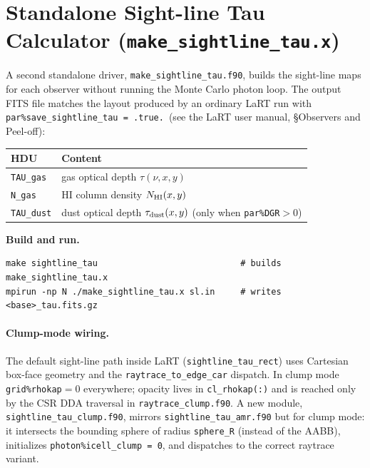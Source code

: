 \documentclass[english,a4paper]{my_memo}
\begin{document}
\section{Standalone Sight-line Tau Calculator (\texttt{make\_sightline\_tau.x})}
\label{sec:standalone_sightline_tau}

A second standalone driver, \texttt{make\_sightline\_tau.f90}, builds
the sight-line maps for each observer without running the Monte Carlo photon
loop.  The output FITS file matches the layout produced by an ordinary
LaRT run with \texttt{par\%save\_sightline\_tau~=~.true.}\ (see the
LaRT user manual, \S Observers and Peel-off):

\begin{center}
\begin{tabular}{ll}
\toprule
HDU & Content \\
\midrule
\texttt{TAU\_gas}  & gas optical depth $\tau(\nu, x, y)$ \\
\texttt{N\_gas}    & HI column density $N_{\rm HI}(x, y)$ \\
\texttt{TAU\_dust} & dust optical depth $\tau_{\rm dust}(x, y)$ (only when \texttt{par\%DGR}$>0$) \\
\bottomrule
\end{tabular}
\end{center}

\smallskip\noindent\textbf{Build and run.}
\begin{lstlisting}
make sightline_tau                            # builds make_sightline_tau.x
mpirun -np N ./make_sightline_tau.x sl.in     # writes <base>_tau.fits.gz
\end{lstlisting}

\paragraph{Clump-mode wiring.}
The default sight-line path inside LaRT (\texttt{sightline\_tau\_rect})
uses Cartesian box-face geometry and the
\texttt{raytrace\_\hspace{0pt}to\_\hspace{0pt}edge\_\hspace{0pt}car}
dispatch.  In clump mode \texttt{grid\%rhokap}$=0$ everywhere; opacity
lives in \texttt{cl\_rhokap(:)} and is reached only by the CSR DDA
traversal in \texttt{raytrace\_clump.f90}.  A new module,
\texttt{sightline\_tau\_clump.f90}, mirrors
\texttt{sightline\_tau\_amr.f90} but for clump mode: it intersects the
bounding sphere of radius \texttt{sphere\_R} (instead of the AABB),
initializes \texttt{photon\%icell\_clump = 0}, and dispatches to the
correct raytrace variant.
\end{document}
